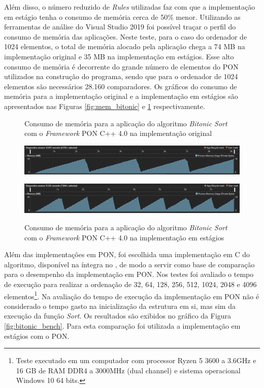 Além disso, o número reduzido de \textit{Rules} utilizadas faz com que a
implementação em estágio tenha o consumo de memória cerca de 50\% menor.
Utilizando as ferramentas de análise do Visual Studio 2019 foi possível traçar o
perfil do consumo de memória das aplicações. Neste teste, para o caso do
ordenador de 1024 elementos, o total de memória alocado pela aplicação chega a
74 MB na implementação original e 35 MB na implementação em estágios. Esse alto
consumo de memória é decorrente do grande número de elementos do PON utilizados
na construção do programa, sendo que para o ordenador de 1024 elementos são
necessários 28.160 comparadores. Os gráficos do consumo de memória para a
implementação original e a implementação em estágios são apresentados nas
Figuras \ref{fig:mem_bitonic} e \ref{fig:mem_bitonic_nop_old} respectivamente.

\begin{figure}[!htb]
\centering
\caption{Consumo de memória para a aplicação do algoritmo \textit{Bitonic Sort}
com o \textit{Framework} PON C++ 4.0 na implementação original}
\smallskip
\includegraphics[width=\textwidth]{../figures/mem_bitonic.png}
\label{fig:mem_bitonic}
\smallskip
\caption{Consumo de memória para a aplicação do algoritmo \textit{Bitonic Sort}
com o \textit{Framework} PON C++ 4.0 na implementação em estágios}
\smallskip
\includegraphics[width=\textwidth]{../figures/mem_bitonic_nop_old.png}
\label{fig:mem_bitonic_nop_old}
\end{figure}

Além das implementações em PON, foi escolhida uma implementação em C do
algoritmo, disponível na íntegra no \cite{pitsianis_2008}, de modo a
servir como base de comparação para o desempenho da implementação em PON. Nos
testes foi avaliado o tempo de execução para realizar a ordenação de 32, 64,
128, 256, 512, 1024, 2048 e 4096 elementos\footnote{Teste executado em um
computador com processor Ryzen 5 3600 a 3.6GHz e 16 GB de RAM DDR4 a 3000MHz
(dual channel) e sistema operacional Windows 10 64 bits.}. Na avaliação do tempo
de execução da implementação em PON não é considerado o tempo gasto na
inicialização da estrutura em si, mas sim da execução da função \textit{Sort}.
Os resultados são exibidos no gráfico da Figura \ref{fig:bitonic_bench}. Para
esta comparação foi utilizada a implementação em estágios com o PON.

